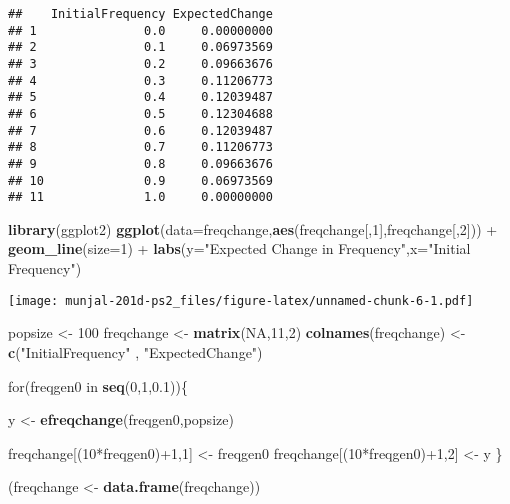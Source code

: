 \documentclass[]{article}
\newenvironment{Shaded}{\begin{snugshade}}{\end{snugshade}}
\newcommand{\KeywordTok}[1]{\textcolor[rgb]{0.13,0.29,0.53}{\textbf{{#1}}}}
\newcommand{\DataTypeTok}[1]{\textcolor[rgb]{0.13,0.29,0.53}{{#1}}}
\newcommand{\DecValTok}[1]{\textcolor[rgb]{0.00,0.00,0.81}{{#1}}}
\newcommand{\FloatTok}[1]{\textcolor[rgb]{0.00,0.00,0.81}{{#1}}}
\newcommand{\StringTok}[1]{\textcolor[rgb]{0.31,0.60,0.02}{{#1}}}
\newcommand{\OtherTok}[1]{\textcolor[rgb]{0.56,0.35,0.01}{{#1}}}
\newcommand{\NormalTok}[1]{{#1}}
\begin{document}
\begin{verbatim}
##    InitialFrequency ExpectedChange
## 1               0.0     0.00000000
## 2               0.1     0.06973569
## 3               0.2     0.09663676
## 4               0.3     0.11206773
## 5               0.4     0.12039487
## 6               0.5     0.12304688
## 7               0.6     0.12039487
## 8               0.7     0.11206773
## 9               0.8     0.09663676
## 10              0.9     0.06973569
## 11              1.0     0.00000000
\end{verbatim}

\begin{Shaded}
\begin{Highlighting}[]
\KeywordTok{library}\NormalTok{(ggplot2)}
\KeywordTok{ggplot}\NormalTok{(}\DataTypeTok{data=}\NormalTok{freqchange,}\KeywordTok{aes}\NormalTok{(freqchange[,}\DecValTok{1}\NormalTok{],freqchange[,}\DecValTok{2}\NormalTok{])) +}\StringTok{ }
\StringTok{        }\KeywordTok{geom_line}\NormalTok{(}\DataTypeTok{size=}\DecValTok{1}\NormalTok{) +}\StringTok{ }
\StringTok{        }\KeywordTok{labs}\NormalTok{(}\DataTypeTok{y=}\StringTok{"Expected Change in Frequency"}\NormalTok{,}\DataTypeTok{x=}\StringTok{"Initial Frequency"}\NormalTok{)}
\end{Highlighting}
\end{Shaded}

\texttt{[image: munjal-201d-ps2\_files/figure-latex/unnamed-chunk-6-1.pdf]}

\begin{Shaded}
\begin{Highlighting}[]
\NormalTok{popsize <-}\StringTok{ }\DecValTok{100}
\NormalTok{freqchange <-}\StringTok{ }\KeywordTok{matrix}\NormalTok{(}\OtherTok{NA}\NormalTok{,}\DecValTok{11}\NormalTok{,}\DecValTok{2}\NormalTok{)}
\KeywordTok{colnames}\NormalTok{(freqchange) <-}\StringTok{ }\KeywordTok{c}\NormalTok{(}\StringTok{"InitialFrequency"} \NormalTok{, }\StringTok{"ExpectedChange"}\NormalTok{)}

\NormalTok{for(freqgen0 in }\KeywordTok{seq}\NormalTok{(}\DecValTok{0}\NormalTok{,}\DecValTok{1}\NormalTok{,}\FloatTok{0.1}\NormalTok{))\{}
  
  \NormalTok{y <-}\StringTok{ }\KeywordTok{efreqchange}\NormalTok{(freqgen0,popsize)}
  
  \NormalTok{freqchange[(}\DecValTok{10}\NormalTok{*freqgen0)+}\DecValTok{1}\NormalTok{,}\DecValTok{1}\NormalTok{] <-}\StringTok{ }\NormalTok{freqgen0}
  \NormalTok{freqchange[(}\DecValTok{10}\NormalTok{*freqgen0)+}\DecValTok{1}\NormalTok{,}\DecValTok{2}\NormalTok{] <-}\StringTok{ }\NormalTok{y}
\NormalTok{\}}


\NormalTok{(freqchange <-}\StringTok{ }\KeywordTok{data.frame}\NormalTok{(freqchange))}
\end{Highlighting}
\end{Shaded}
\end{document}
